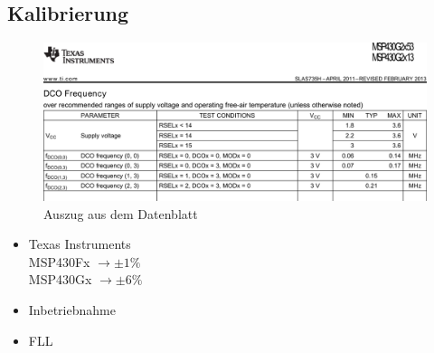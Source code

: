 \subsection{Kalibrierung}
\begin{frame}
  \begin{figure}
    \includegraphics[width=1.0\columnwidth]{fig/ti_ds_dco_freq.pdf}
    \caption{Auszug aus dem Datenblatt}
  \end{figure}
\end{frame}
\begin{frame}
  \begin{itemize}
    \item Texas Instruments \pause \\
      MSP430Fx $\rightarrow \pm 1 \%$ \pause \\
      MSP430Gx $\rightarrow \pm 6 \%$ \pause \\
    \item Inbetriebnahme \pause
    \item FLL
  \end{itemize}
\end{frame}